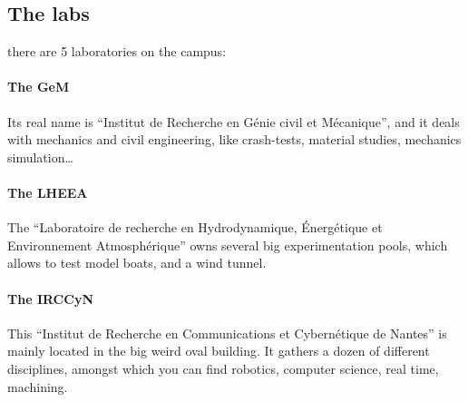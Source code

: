 \subsection{The labs}\trad
there are 5 laboratories on the campus:
\paragraph{The GeM} Its real name is “Institut de Recherche en Génie civil et Mécanique”, and it deals with mechanics and civil engineering, like crash-tests, material studies, mechanics simulation\dots %
\paragraph{The LHEEA} The “Laboratoire de recherche en Hydrodynamique, Énergétique et Environnement Atmosphérique” owns several big experimentation pools, which allows to test model boats, and a wind tunnel. %
\paragraph{The IRCCyN} This “Institut de Recherche en Communications et Cybernétique de Nantes” is mainly located in the big weird oval building. It gathers a dozen of different disciplines, amongst which you can find robotics, computer science, real time, machining. %
